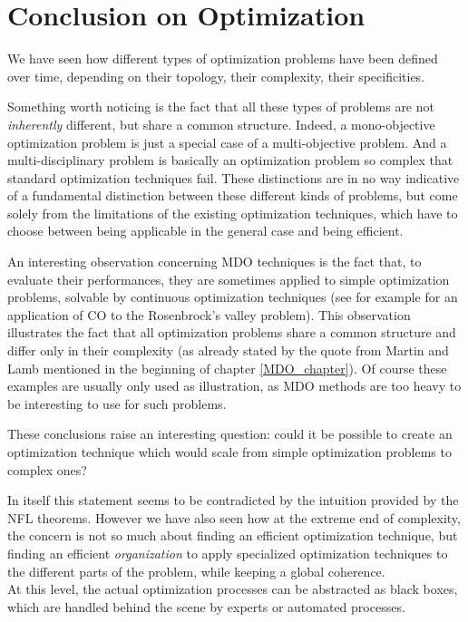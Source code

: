 \chapter*{Conclusion on Optimization}

We have seen how different types of optimization problems have been defined over time, depending on their topology, their complexity, their specificities.

Something worth noticing is the fact that all these types of problems are not \emph{inherently} different, but share a common structure. Indeed, a mono-objective optimization problem is just a special case of a multi-objective problem. And a multi-disciplinary problem is basically an optimization problem so complex that standard optimization techniques fail. These distinctions are in no way indicative of a fundamental distinction between these different kinds of problems, but come solely from the limitations of the existing optimization techniques, which have to choose between being applicable in the general case and being efficient.

An interesting observation concerning MDO techniques is the fact that, to evaluate their performances, they are sometimes applied to simple optimization problems, solvable by continuous optimization techniques (see for example \cite{Kroo:1994:MOM} for an application of CO to the Rosenbrock's valley problem). This observation illustrates the fact that all optimization problems share a common structure and differ only in their complexity (as already stated by the quote from Martin and Lamb mentioned in the beginning of chapter \ref{MDO_chapter}). Of course these examples are usually only used as illustration, as MDO methods are too heavy to be interesting to use for such problems.

These conclusions raise an interesting question: could it be possible to create an optimization technique which would scale from simple optimization problems to complex ones?

In itself this statement seems to be contradicted by the intuition provided by the NFL theorems. However we have also seen how at the extreme end of complexity, the concern is not so much about finding an efficient optimization technique, but finding an efficient \emph{organization} to apply specialized optimization techniques to the different parts of the problem, while keeping a global coherence.\\
At this level, the actual optimization processes can be abstracted as black boxes, which are handled behind the scene by experts or automated processes.

